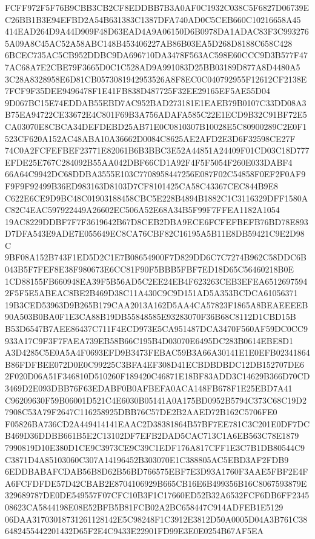 \documentclass[UTF8,fontset=fandol,zihao=-4,a4paper]{ctexart}
\begin{document}
{{FCFF972F5F76B9CBB3CB2CF8EDDBB7B3A0AF0C1932C038C5F6827D06739EC26BB1B3E94EFBD2A54B631383C1387DFA740AD0C5CEB660C10216658A45
414EAD264D9A44D909F48D63EAD4A9A06150D6B0978DA1ADAC83F3C9932765A09A8C45AC52A58ABC148B453406227AB86B03EA5D268D8188C658C428
6BCEC735AC5CB952DDBC9DA696710DA3478F563AC598E60CCC9D3B577F477AC68A7E2CBE79F3665D0C1C528AD9A991083D25BB03189D877A8D4480A5
3C28A8328958E6D81CB0573081942953526A8F8EC0C040792955F12612CF2138E7FCF9F35DEE9496478F1E41FB838D487725F32EE29165EF5AE55D04
9D067BC15E74EDDAB55EBD7AC952BAD273181E1EAEB79B0107C33DD08A3B75EA94722CE33672E4C801F69B3A756ADAFA585C22E1ECD9B32C91BF72E5
CA03070E8CBCA34DEFDEBD25AB71E0C0810307B10028E5C80900289C2E0F1523CF620A152AC48ABA10A36662D0084C8625AE2AFD2E3D6F32598CE27F
74C0A2FCFEFBEF23771E82061B6B3BBC3E52A44851A24409F01CD03C18D777EFDE25E767C284092B55AA042DBF66CD1A92F4F5F5054F260E033DABF4
66A64C9942DC68DDBA3555E103C7708958447256E087F02C54858F0EF2F0AF9F9F9F92499B36ED983163D8103D7CF8101425CA58C43367CEC844B9E8
C622E6CE9D9BC48C01903188458CBC5E228B4894B1882C1C3116329DFF1580AC82C4EAC597922449A26602EC506A52E68A34B5F99F7FFEA1182A1054
19AC8229DDBF7F7F3619642B67D8CEB2DBA9ECE6FCFEFBEFB76BD78E893D7DFA543E9ADE7E055649EC8CA76CBF82C16195A5B11E8DB59421C9E2D98C
9BF08A152B743F1ED5D2C1E7B08654900F7D829DD6C7C7274B962C58DDC6B043B5F7FEF8E38F980673E6CC81F90F5BBB5FBF7ED18D65C56460218B0E
1CD88155FB660948EA39F5B56AD5C2EE24EB4F623263CEB3EFEA65126975942F5F5E5ABEAC8BE2B469D38C11A430C9C9D151AD5A353BCDCA61056371
19B3CED53963D9B265B179CAA2013A162D5AA4CA57823F1865A8BEAEEEEB90A503B0BA0F1E3CA88B19DB55848585E93283070F36B68C8112D1CBD15B
B53D6547B7AEE86437C711F4ECD973E5CA951487DCA3470F560AF59DC0CC9933A17C9F3F7FAEA739EB58B66C195B4D03070E6495DC283B0614EBE8D1
A3D4285C5E0A5A4F0693EFD9B3473FEBAC59B3A66A30141E1E0EFB02341864B86FDFBEE072D0E0C99225C3BFA4EF308D41ECBDBDBDC12DB152707DE6
2F020D06A51F346810D510260F189420C46871E18BF83ADD3C14629B366D70CD3469D2E093DBB76F63EDABF0B0AFBEFA0ACA148FB678F1E25EBD7A41
C96209630F59B06001D521C4E6030B05141A0A175BD0952B5794C373C68C19D27908C53A79F2647C116258925DBB76C57DE2B2AAED72B162C5706FE0
F05826BA736CD2A449414141EAAC2D38381864B57BF7EE781C3C201E0DF7DCB469D36DDBB661B5E2C13102DF7EFB2DAD5CAC713C1A6EB563C78E1879
7990819D10E380D1CE9C3973CE9C39C1EDF176A817CFF1E3C7B1DB80544C9C3871D4A85103060C307A14196452B303070E1C388805AC5EBD3AF2FDB9
6EDDBABAFCDAB56B8D62B56BD766575EBF7E3D93A1760F3AAE5FBF2E4FA6FCFDFDE57D42CBAB2E8704106929B665CB16E6B499356B16C8067593879E
329689787DE0DE549557F07CFC10B3F1C17660ED52B32A6532FCF6DB6FF234508623CA5844198E08E52BFB5B81FCB02A2BC658447C914ADFEB1E5129
06DAA31703018731261128142E5C98248F1C3912E3812D50A0005D04A3B761C386482455442201432D65F2E4C9433E22901FD99E3E0E0254B67AF5EA
}}
\end{document}
